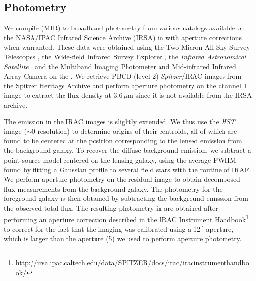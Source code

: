 \documentclass[]{emulateapj}
\begin{document}
\subsection{Photometry} \label{sec:photometry} %
We compile \mir (MIR) to \fir broadband photometry from various
catalogs available on the NASA/IPAC Infrared Science
Archive (IRSA) in  with aperture corrections
when warranted. These data were obtained using
the Two Micron All Sky Survey Telescopes \citep[2MASS;][]{Skrutskie06a},
the Wide-field Infrared Survey Explorer \citep[{\it WISE};][]{Wright10a},
the {\it Infrared Astronomical Satellite}
\citep[{\it IRAS};][]{Neugebauer84a}, and
the Multiband Imaging Photometer \citep[MIPS;][]{Rieke04a} and
Mid-infrared Infrared Array Camera \citep[IRAC;][]{Fazio04a} on
the \spitzer.
We retrieve PBCD (level 2) {\it Spitzer}/IRAC images from the
Spitzer Heritage Archive and perform aperture photometry on
the channel 1 image to extract the flux density at 3.6\,$\mu$m
since it is not available from the IRSA archive.

The emission in the IRAC images is slightly extended. We thus use the
{\it HST} image ($\sim$0 resolution) to determine
origins of their centroids, all of which are found to be
centered at the position corresponding to the lensed emission from the
background galaxy. To recover the diffuse background emission, we subtract a
point source model centered on the lensing galaxy, using the average
FWHM found by fitting a Gaussian profile to several field stars
with the  routine of IRAF.
We perform aperture photometry on the residual image
to obtain decomposed flux measurements from the background galaxy.
The photometry for the foreground galaxy is then obtained
by subtracting the background emission from the
observed total flux. The resulting photometry in
 are obtained after performing an aperture correction
described in the IRAC Instrument Handbook\footnote{http://irsa.ipac.caltech.edu/data/SPITZER/docs/irac/iracinstrumenthandbook/} to
correct for the fact that the imaging was calibrated
using a 12$^{\prime\prime}$ aperture, which is larger than the aperture (5) we used to
perform aperture photometry.
\end{document}
